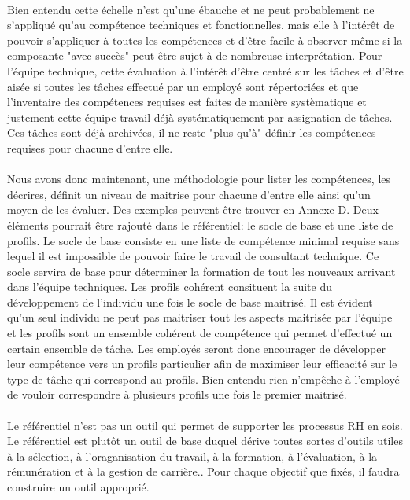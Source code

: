 \paragraph{}Bien entendu cette échelle n'est qu'une ébauche et ne peut probablement ne s'appliqué qu'au compétence techniques et fonctionnelles, mais elle à l'intérêt de pouvoir s'appliquer à toutes les compétences et d'être facile à observer même si la composante "avec succès" peut être sujet à de nombreuse interprétation. Pour l'équipe technique, cette évaluation à l'intérêt d'être centré sur les tâches et d'être aisée si toutes les tâches effectué par un employé sont répertoriées et que l'inventaire des compétences requises est faites de manière systèmatique et justement cette équipe travail déjà systématiquement par assignation de tâches. Ces tâches sont déjà archivées, il ne reste "plus qu'à" définir les compétences requises pour chacune d'entre elle. 

\paragraph{} Nous avons donc maintenant, une méthodologie pour lister les compétences, les décrires, définit un niveau de maitrise pour chacune d'entre elle ainsi qu'un moyen de les évaluer. Des exemples peuvent être trouver en Annexe D. Deux éléments pourrait être rajouté dans le référentiel: le socle de base et une liste de profils. Le socle de base consiste en une liste de compétence minimal requise sans lequel il est impossible de pouvoir faire le travail de consultant technique. Ce socle servira de base pour déterminer la formation de tout les nouveaux arrivant dans l'équipe techniques. Les profils cohérent consituent la suite du développement de l'individu une fois le socle de base maitrisé. Il est évident qu'un seul individu ne peut pas maitriser tout les aspects maitrisée par l'équipe et les profils sont un ensemble cohérent de compétence qui permet d'effectué un certain ensemble de tâche. Les employés seront donc encourager de développer leur compétence vers un profils particulier afin de maximiser leur efficacité sur le type de tâche qui correspond au profils. Bien entendu rien n'empêche à l'employé de vouloir correspondre à plusieurs profils une fois le premier maitrisé.  



\paragraph{}Le référentiel n'est pas un outil qui permet de supporter les processus RH en sois. Le référentiel est plutôt un outil de base duquel dérive toutes sortes d'outils utiles à la sélection, à l'oraganisation du travail, à la formation, à l'évaluation, à la rémunération et à la gestion de carrière.\citep[pp.29]{refcompetence}. Pour chaque objectif que fixés, il faudra construire un outil approprié. 

